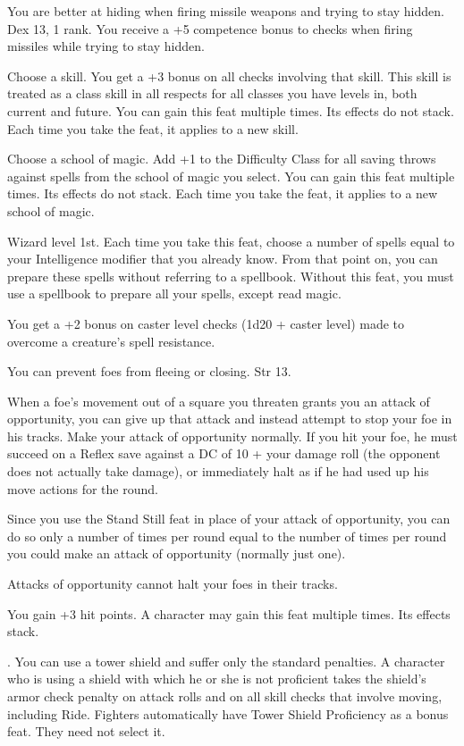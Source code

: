 {You are better at hiding when firing missile weapons and trying to stay hidden.}
{Dex 13,  1 rank.}
{You receive a +5 competence bonus to  checks when firing missiles while trying to stay hidden.}{}{}

{Choose a skill.}{}
{You get a +3 bonus on all checks involving that skill. This skill is treated as a class skill in all respects for all classes you have levels in, both current and future.}{}
{You can gain this feat multiple times. Its effects do not stack. Each time you take the feat, it applies to a new skill.}

{Choose a school of magic.}{}
{Add +1 to the Difficulty Class for all saving throws against spells from the school of magic you select.}{}
{You can gain this feat multiple times. Its effects do not stack. Each time you take the feat, it applies to a new school of magic.}

{Wizard level 1st.}
{Each time you take this feat, choose a number of spells equal to your Intelligence modifier that you already know. From that point on, you can prepare these spells without referring to a spellbook.}
{Without this feat, you must use a spellbook to prepare all your spells, except read magic.}{}

{You get a +2 bonus on caster level checks (1d20 + caster level) made to overcome a creature's spell resistance.}

{You can prevent foes from fleeing or closing.}
{Str 13.}
{When a foe's movement out of a square you threaten grants you an attack of opportunity, you can give up that attack and instead attempt to stop your foe in his tracks. Make your attack of opportunity normally. If you hit your foe, he must succeed on a Reflex save against a DC of 10 + your damage roll (the opponent does not actually take damage), or immediately halt as if he had used up his move actions for the round.

Since you use the Stand Still feat in place of your attack of opportunity, you can do so only a number of times per round equal to the number of times per round you could make an attack of opportunity (normally just one).}
{Attacks of opportunity cannot halt your foes in their tracks.}{}

{}{}
{You gain +3 hit points.}{}
{A character may gain this feat multiple times. Its effects stack.}

{}
{.}
{You can use a tower shield and suffer only the standard penalties.}
{A character who is using a shield with which he or she is not proficient takes the shield's armor check penalty on attack rolls and on all skill checks that involve moving, including Ride.}
{Fighters automatically have Tower Shield Proficiency as a bonus feat. They need not select it.}

